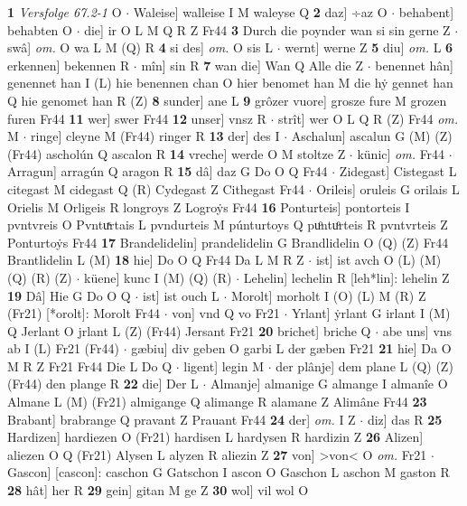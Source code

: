 \documentclass[8pt,a4paper,notitlepage]{article}
\begin{document}
\begin{table}[ht]
\begin{minipage}[t]{0.5\linewidth}
\textbf{1} \textit{Versfolge 67.2-1} O   $\cdot$ Waleise] walleise I M waleyse Q \textbf{2} daz] ÷az O  $\cdot$ behabent] behabten O  $\cdot$ die] ir O L M Q R Z Fr44 \textbf{3} Durch die poynder wan si sin gerne Z  $\cdot$ swâ] \textit{om.} O wa L M (Q) R \textbf{4} si des] \textit{om.} O sis L  $\cdot$ wernt] werne Z \textbf{5} diu] \textit{om.} L \textbf{6} erkennen] bekennen R  $\cdot$ mîn] sin R \textbf{7} wan die] Wan Q Alle die Z  $\cdot$ benennet hân] genennet han I (L) hie benennen chan O hier benomet han M die hẏ gennet han Q hie genomet han R (Z) \textbf{8} sunder] ane L \textbf{9} grôzer vuore] grosze fure M grozen furen Fr44 \textbf{11} wer] swer Fr44 \textbf{12} unser] vnsz R  $\cdot$ strît] wer O L Q R (Z) Fr44 \textit{om.} M  $\cdot$ ringe] cleyne M (Fr44) ringer R \textbf{13} der] des I  $\cdot$ Aschalun] ascalun G (M) (Z) (Fr44) ascholún Q ascalon R \textbf{14} vreche] werde O M stoltze Z  $\cdot$ künic] \textit{om.} Fr44  $\cdot$ Arragun] arragún Q aragon R \textbf{15} dâ] daz G Do O Q Fr44  $\cdot$ Zidegast] Cistegast L citegast M cidegast Q (R) Cydegast Z Cithegast Fr44  $\cdot$ Orileis] oruleis G orilais L Orielis M Orligeis R longroys Z Logroẏs Fr44 \textbf{16} Ponturteis] pontorteis I pvntvreis O Pvntuͯrtais L pvndurteis M púnturtoys Q puͦntuͦrteis R pvntvrteis Z Ponturtoẏs Fr44 \textbf{17} Brandelidelin] prandelidelin G Brandlidelin O (Q) (Z) Fr44 Brantlidelin L (M) \textbf{18} hie] Do O Q Fr44 Da L M R Z  $\cdot$ ist] ist avch O (L) (M) (Q) (R) (Z)  $\cdot$ küene] kunc I (M) (Q) (R)  $\cdot$ Lehelin] lechelin R [leh*lin]: lehelin Z \textbf{19} Dâ] Hie G Do O Q  $\cdot$ ist] ist ouch L  $\cdot$ Morolt] morholt I (O) (L) M (R) Z (Fr21) [*orolt]: Morolt  Fr44  $\cdot$ von] vnd Q vo Fr21  $\cdot$ Yrlant] ẏrlant G irlant I (M) Q Jerlant O jrlant L (Z) (Fr44) Jersant Fr21 \textbf{20} brichet] briche Q  $\cdot$ abe uns] vns ab I (L) Fr21 (Fr44)  $\cdot$ gæbiu] div geben O garbi L der gæben Fr21 \textbf{21} hie] Da O M R Z Fr21 Fr44 Die L Do Q  $\cdot$ ligent] legin M  $\cdot$ der plânje] dem plane L (Q) (Z) (Fr44) den plange R \textbf{22} die] Der L  $\cdot$ Almanje] almanige G almange I almanîe O Almane L (M) (Fr21) almigange Q alimange R alamane Z Alimâne Fr44 \textbf{23} Brabant] brabrange Q pravant Z Prauant Fr44 \textbf{24} der] \textit{om.} I Z  $\cdot$ diz] das R \textbf{25} Hardizen] hardiezen O (Fr21) hardisen L hardysen R hardizin Z \textbf{26} Alizen] aliezen O Q (Fr21) Alysen L alyzen R aliezin Z \textbf{27} von] >von< O \textit{om.} Fr21  $\cdot$ Gascon] [cascon]: caschon G Gatschon I ascon O Gaschon L aschon M gaston R \textbf{28} hât] her R \textbf{29} gein] gitan M ge Z \textbf{30} wol] vil wol O \newline

\end{minipage}
\end{table}
\end{document}
